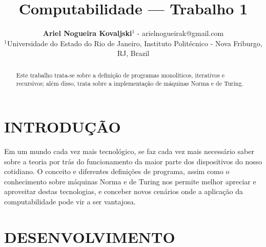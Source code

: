 \documentclass[12pt,fleqn]{article}
\title{Computabilidade --- Trabalho 1}
\author
    {\rm \begin{tabular}{l}
    \textbf{Ariel Nogueira Kovaljski}$^{1}$ - {\textnormal
    arielnogueirak@gmail.com}\\%
    {\fontsize{11}{0}\selectfont $^{1}$Universidade do Estado do Rio de
    Janeiro, Instituto Politécnico - Nova Friburgo, RJ,
    Brazil}\vspace*{-0.05cm} \\
  \end{tabular}}
\renewcommand{\headrulewidth}{0.0pt}
\begin{document}
%

\vspace{-3cm}

\maketitle


\pagestyle{empty}

\thispagestyle{firspagetstyle}

\begin{abstract}
    Este trabalho trata-se sobre a definição de programas monolíticos,
    iterativos e recursivos; além disso, trata sobre a implementação de máquinas
    Norma e de Turing.
\end{abstract}



\fancyhead[L]{\footnotesize{\fontsize{7.5}{0}\selectfont \it}}

\renewcommand{\headrulewidth}{0.0pt}
\fancyfoot[C]{\footnotesize \parbox{15cm} {\centering
\fontsize{7.5}{0}\selectfont \it  }} %
\rhead{}


\pagestyle{fancy}


\section{INTRODUÇÃO}
Em um mundo cada vez mais tecnológico, se faz cada vez mais necessário saber
sobre a teoria por trás do funcionamento da maior parte dos dispositivos do
nosso cotidiano. O conceito e diferentes definições de programa, assim como o
conhecimento sobre máquinas Norma e de Turing nos permite melhor apreciar e
aproveitar destas tecnologias, e conceber novos cenários onde a aplicação da
computabilidade pode vir a ser vantajosa.

\section{DESENVOLVIMENTO}
\end{document}
